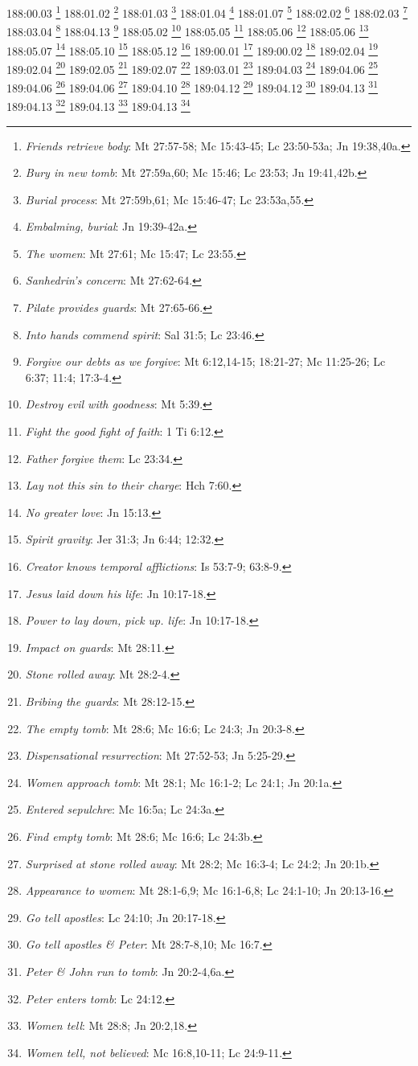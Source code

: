 188:00.03 \footnote{\textit{Friends retrieve body}: Mt 27:57-58; Mc 15:43-45; Lc 23:50-53a; Jn 19:38,40a.}
188:01.02 \footnote{\textit{Bury in new tomb}: Mt 27:59a,60; Mc 15:46; Lc 23:53; Jn 19:41,42b.}
188:01.03 \footnote{\textit{Burial process}: Mt 27:59b,61; Mc 15:46-47; Lc 23:53a,55.}
188:01.04 \footnote{\textit{Embalming, burial}: Jn 19:39-42a.}
188:01.07 \footnote{\textit{The women}: Mt 27:61; Mc 15:47; Lc 23:55.}
188:02.02 \footnote{\textit{Sanhedrin's concern}: Mt 27:62-64.}
188:02.03 \footnote{\textit{Pilate provides guards}: Mt 27:65-66.}
188:03.04 \footnote{\textit{Into hands commend spirit}: Sal 31:5; Lc 23:46.}
188:04.13 \footnote{\textit{Forgive our debts as we forgive}: Mt 6:12,14-15; 18:21-27; Mc 11:25-26; Lc 6:37; 11:4; 17:3-4.}
188:05.02 \footnote{\textit{Destroy evil with goodness}: Mt 5:39.}
188:05.05 \footnote{\textit{Fight the good fight of faith}: 1 Ti 6:12.}
188:05.06 \footnote{\textit{Father forgive them}: Lc 23:34.}
188:05.06 \footnote{\textit{Lay not this sin to their charge}: Hch 7:60.}
188:05.07 \footnote{\textit{No greater love}: Jn 15:13.}
188:05.10 \footnote{\textit{Spirit gravity}: Jer 31:3; Jn 6:44; 12:32.}
188:05.12 \footnote{\textit{Creator knows temporal afflictions}: Is 53:7-9; 63:8-9.}
189:00.01 \footnote{\textit{Jesus laid down his life}: Jn 10:17-18.}
189:00.02 \footnote{\textit{Power to lay down, pick up. life}: Jn 10:17-18.}
189:02.04 \footnote{\textit{Impact on guards}: Mt 28:11.}
189:02.04 \footnote{\textit{Stone rolled away}: Mt 28:2-4.}
189:02.05 \footnote{\textit{Bribing the guards}: Mt 28:12-15.}
189:02.07 \footnote{\textit{The empty tomb}: Mt 28:6; Mc 16:6; Lc 24:3; Jn 20:3-8.}
189:03.01 \footnote{\textit{Dispensational resurrection}: Mt 27:52-53; Jn 5:25-29.}
189:04.03 \footnote{\textit{Women approach tomb}: Mt 28:1; Mc 16:1-2; Lc 24:1; Jn 20:1a.}
189:04.06 \footnote{\textit{Entered sepulchre}: Mc 16:5a; Lc 24:3a.}
189:04.06 \footnote{\textit{Find empty tomb}: Mt 28:6; Mc 16:6; Lc 24:3b.}
189:04.06 \footnote{\textit{Surprised at stone rolled away}: Mt 28:2; Mc 16:3-4; Lc 24:2; Jn 20:1b.}
189:04.10 \footnote{\textit{Appearance to women}: Mt 28:1-6,9; Mc 16:1-6,8; Lc 24:1-10; Jn 20:13-16.}
189:04.12 \footnote{\textit{Go tell apostles}: Lc 24:10; Jn 20:17-18.}
189:04.12 \footnote{\textit{Go tell apostles & Peter}: Mt 28:7-8,10; Mc 16:7.}
189:04.13 \footnote{\textit{Peter & John run to tomb}: Jn 20:2-4,6a.}
189:04.13 \footnote{\textit{Peter enters tomb}: Lc 24:12.}
189:04.13 \footnote{\textit{Women tell}: Mt 28:8; Jn 20:2,18.}
189:04.13 \footnote{\textit{Women tell, not believed}: Mc 16:8,10-11; Lc 24:9-11.}
